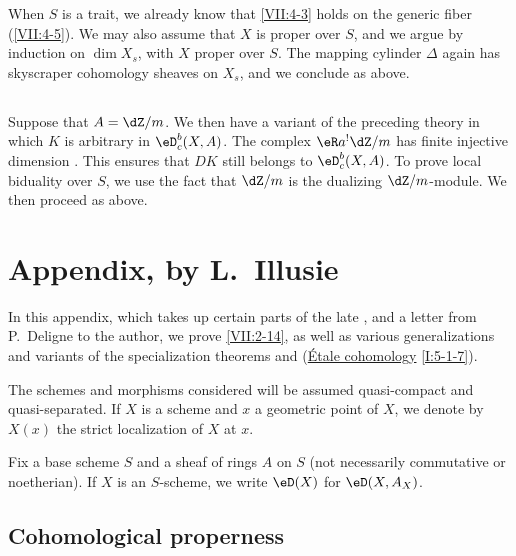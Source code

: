 When $S$ is a trait, we already know that \ref{VII:4-3} holds on the generic
fiber (\ref{VII:4-5}). We may also assume that $X$ is proper over $S$, and we
argue by induction on $\dim{X_s}$, with $X$ proper over $S$. The mapping
cylinder $\Delta$ again has skyscraper cohomology sheaves on $X_s$, and we
conclude as above.





\subsection{}\label{VII:4-7}

Suppose that $A=\dZ/m$. We then have a variant of the preceding theory in
which $K$ is arbitrary in $\eD_c^b(X,A)$. The complex $\eR a^! \dZ/m$ has
finite injective dimension \cite[XVIII 3.1.7]{sga4}. This ensures that $D K$
still belongs to $\eD_c^b(X,A)$. To prove local biduality over $S$, we use the
fact that $\dZ/m$ is the dualizing $\dZ/m$-module. We then proceed as above.










\section{Appendix, by L.\ Illusie}\label{VII:5}

In this appendix, which takes up certain parts of the late
\cite[II]{sga5}, and a letter from P.\ Deligne to the author, we prove
\ref{VII:2-14}, as well as various generalizations and variants of the
specialization theorems \cite[XVI 2.1]{sga4} and
(\hyperref[I]{Étale cohomology} \ref{I:5-1-7}).

The schemes and morphisms considered will be assumed quasi-compact and
quasi-separated. If $X$ is a scheme and $x$ a geometric point of $X$, we
denote by $X(x)$ the strict localization of $X$ at $x$.

Fix a base scheme $S$ and a sheaf of rings $A$ on $S$ (not necessarily
commutative or noetherian). If $X$ is an $S$-scheme, we write $\eD(X)$ for
$\eD(X,A_X)$.





\subsection{Cohomological properness}\label{VII:5-1}






